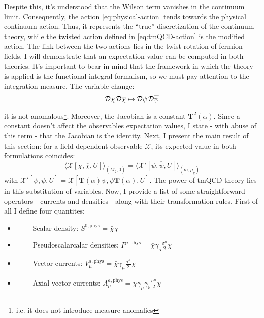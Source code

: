 \documentclass[english, LaM, oneside, noexaminfo]{sapthesis}
\newcommand{\la}{\langle}
\newcommand{\ra}{\rangle}
\begin{document}
Despite this, it's understood that the Wilson term vanishes in the continuum limit.
Consequently, the action \ref{eq:physical-action} tends towards the physical continuum action.
Thus, it represents the ``true'' discretization of the continuum theory, while the twisted action defined in \ref{eq:tmQCD-action} is the modified action.
\newline
The link between the two actions lies in the twist rotation of fermion fields.
I will demonstrate that an expectation value can be computed in both theories.
It's important to bear in mind that the framework in which the theory is applied is the functional integral formalism, so we must pay attention to the integration measure.
The variable change:
\begin{equation*}
    \mathcal{D}\chi \hspace*{0.5mm} \mathcal{D}\overline{\chi} \mapsto \mathcal{D}\psi \hspace*{0.5mm} \mathcal{D}\overline{\psi}
\end{equation*}
it is not anomalous\footnote{i.e. it does not introduce measure anomalies}.
Moreover, the Jacobian is a constant $\mathbf{T}^2(\alpha)$.
Since a constant doesn't affect the observables expectation values, I state - with abuse of this term - that the Jacobian is the identity.
Next, I present the main result of this section: for a field-dependent observable $\mathcal{X}$, its expected value in both formulations coincides:
\begin{equation*}
    \la \mathcal{X} [\chi, \overline{\chi}, U] \ra_{(M_q,0)} = \la \mathcal{X}' [\psi, \overline{\psi}, U] \ra_{(m,\mu_q)}
\end{equation*}
with $\mathcal{X}' [\psi, \overline{\psi}, U] = \mathcal{X} [\mathbf{T}(\alpha)\psi, \overline{\psi}\mathbf{T}(\alpha), U]$.
The power of tmQCD theory lies in this substitution of variables.
\newline
Now, I provide a list of some straightforward operators - currents and densities - along with their transformation rules.
First of all I define four quantites:
\begin{itemize}
    \item [] $\qquad$ Scalar density: \hspace*{5mm} $S^{0,\text{phys}} = \bar\chi \chi$
    \item [] $\qquad$ Pseudoscalarcalar densities: \hspace*{5mm} $P^{a,\text{phys}} = \bar\chi \gamma_5 \frac{\sigma^a}{2} \chi$
    \item [] $\qquad$ Vector currents: \hspace*{5mm} $V_{\mu}^{a,\text{phys}} = \bar\chi \gamma_\mu \frac{\sigma^a}{2} \chi$
    \item [] $\qquad$ Axial vector currents: \hspace*{5mm} $A_\mu^{a,\text{phys}} = \bar\chi \gamma_\mu \gamma_5 \frac{\sigma^a}{2} \chi$
\end{itemize}
\end{document}
